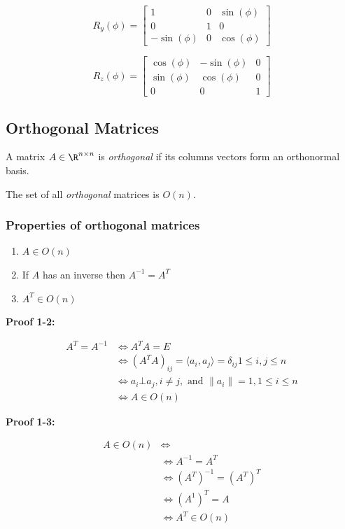\[
    R_y (\phi) =
    \begin{bmatrix}
        1 & 0 & \sin(\phi) \\
        0 & 1 & 0 \\
        -\sin(\phi) & 0 & \cos(\phi)
    \end{bmatrix}
\]

\[
    R_z (\phi) =
    \begin{bmatrix}
        \cos(\phi) & -\sin(\phi) & 0 \\
        \sin(\phi) & \cos(\phi) & 0 \\
        0 & 0 & 1
    \end{bmatrix}
\]

\subsection{Orthogonal Matrices}

A matrix \(A \in \R^{n \times n}\) is \emph{orthogonal} if its columns vectors form an orthonormal 
basis.

The set of all \emph{orthogonal} matrices is \(O(n)\).

\subsubsection{Properties of orthogonal matrices}

\begin{enumerate}
    \item \(A \in O(n)\)
    \item If \(A\) has an inverse then \(A^{-1} = A^T\)
    \item \(A^T \in O(n)\)
\end{enumerate}

\textbf{Proof 1-2:}

\begin{align*}
    A^T = A^{-1} &\iff A^T A = E\\
                 &\iff (A^T A)_{ij} = \langle a_i, a_j\rangle = \delta_{ij} 1 \le i,j \le n\\
                 &\iff a_i \bot a_j, i \ne j, \text{ and } \|a_i\| = 1, 1 \le i \le n\\
                 &\iff A \in O(n)
\end{align*}

\textbf{Proof 1-3:}

\begin{align*}
    A \in O(n) &\iff \\
               &\iff A^{-1} = A^T\\
               &\iff (A^T)^{-1} = (A^T)^T \\
               &\iff (A^{1})^{T} = A\\
               &\iff A^T \in O(n)
\end{align*}

